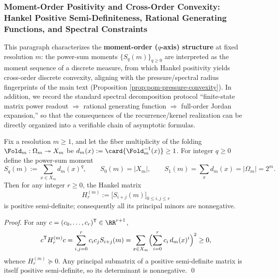 \subsubsection{Moment-Order Positivity and Cross-Order Convexity: Hankel Positive Semi-Definiteness, Rational Generating Functions, and Spectral Constraints}\label{subsubsec:pom-moment-hankel-positivity-crossq}
This paragraph characterizes the \textbf{moment-order (\(q\)-axis) structure} at fixed resolution \(m\): the power-sum moments \(\{S_q(m)\}_{q\ge 0}\) are interpreted as the moment sequence of a discrete measure,
from which Hankel positivity yields cross-order discrete convexity, aligning with the pressure/spectral radius fingerprints of the main text (Proposition \ref{prop:pom-pressure-convexity}).
In addition, we record the standard spectral decomposition protocol ``finite-state matrix power readout \(\Rightarrow\) rational generating function \(\Rightarrow\) full-order Jordan expansion,''
so that the consequences of the recurrence/kernel realization can be directly organized into a verifiable chain of asymptotic formulas.

\begin{proposition}\label{prop:pom-power-sum-hankel-psd}
Fix a resolution \(m\ge 1\), and let the fiber multiplicity of the folding \(\Fold_m:\Omega_m\twoheadrightarrow X_m\) be
\(
d_m(x):=\card{\Fold_m^{-1}(x)}\ge 1
\).
For integer \(q\ge 0\) define the power-sum moment
\[
S_q(m):=\sum_{x\in X_m} d_m(x)^q,
\qquad
S_0(m)=|X_m|,
\qquad
S_1(m)=\sum_x d_m(x)=|\Omega_m|=2^m.
\]
Then for any integer \(r\ge 0\), the Hankel matrix
\[
H^{(m)}_r:=\bigl[S_{i+j}(m)\bigr]_{0\le i,j\le r}
\]
is positive semi-definite; consequently all its principal minors are nonnegative.
\end{proposition}
\begin{proof}
For any \(c=(c_0,\dots,c_r)^{\mathsf T}\in\RR^{r+1}\),
\[
c^{\mathsf T}H^{(m)}_r c
=\sum_{i,j=0}^{r} c_ic_jS_{i+j}(m)
=\sum_{x\in X_m}\Bigl(\sum_{i=0}^{r}c_i\,d_m(x)^i\Bigr)^2
\ge 0,
\]
whence \(H^{(m)}_r\succeq 0\).
Any principal submatrix of a positive semi-definite matrix is itself positive semi-definite, so its determinant is nonnegative. \qed
\end{proof}

